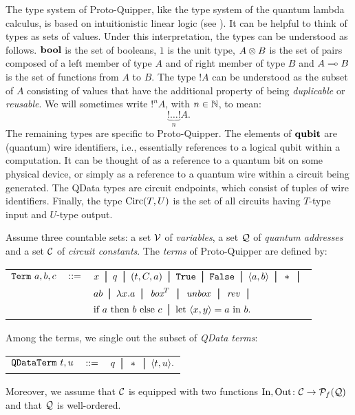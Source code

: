 \documentclass[twoside]{article}
\begin{document}
The type system of Proto-Quipper, like the type system of the quantum lambda calculus, 
is based on intuitionistic linear logic (see \cite{Gir87}). 
It can be helpful to think of types as sets of values. Under this 
interpretation, the types can be understood as follows. $\textrm{\bf bool}$ is 
the set of booleans, $1$ is the unit type, $A\otimes B$ is the set of 
pairs composed of a left member of type $A$ and of right member 
of type $B$ and $A\multimap B$ is the set of functions from $A$ to 
$B$. The type $!A$ can be understood as the subset of $A$ 
consisting of values that have the additional property of being 
\emph{duplicable} or \emph{reusable}. We will sometimes write 
$!^nA$, with $n\in\mathbb{N}$, to mean: 
\[
\underbrace{!\ldots !}_{n} A.
\]
The remaining types are specific to Proto-Quipper. The elements 
of $\textrm{\bf qubit}$ are (quantum) wire identifiers, i.e., essentially 
references to a  logical qubit within a computation. It can be 
thought of as a reference to a quantum bit on some physical device, 
or simply as a  reference to a quantum wire within a circuit being 
generated. The QData types are circuit endpoints, which consist of 
tuples of wire identifiers. Finally, the type $\mathop{\textrm{Circ}}\nolimits(T,U)$ is the 
set of all circuits having $T$-type input and $U$-type output. 

\begin{definition}
Assume three countable sets: a set $\mathcal{V}$ of \emph{variables}, a 
set $\mathcal{Q}$ of \emph{quantum addresses} and a set $\mathcal{C}$ of 
\emph{circuit constants}. The \emph{terms} of Proto-Quipper are 
defined by:
\begin{center}
\begin{tabular}{rcl}
$\texttt{Term}~a,b,c$ & $::=$ & $x \bor q \bor (t,C,a) \bor \true 
  \bor \false \bor \p{a,b} \bor * \bor$ \\[0.05in]
& & $ab \bor \lambda x.a \bor \boxx^T \bor \unbox \bor \rev 
    \bor $\\[0.05in]
& & $\ifthenelse{a}{b}{c} \bor \letin{\p{x,y}}{a}{b}.$
\end{tabular}
\end{center}
Among the terms, we single out the subset of \emph{QData terms}:
\begin{center}
\begin{tabular}{rcl}
$\texttt{QDataTerm}~t,u$ & $::=$ & $q \bor * \bor \p{t,u}.$
\end{tabular}
\end{center}
Moreover, we assume that $\mathcal{C}$ is equipped with two functions 
$\mathop{\textrm{In}}\nolimits,\mathop{\textrm{Out}}\nolimits\colon \mathcal{C}\to\mathcal{P}_f(\mathcal{Q})$ and that $\mathcal{Q}$ is 
well-ordered.
\end{definition}
\end{document}

